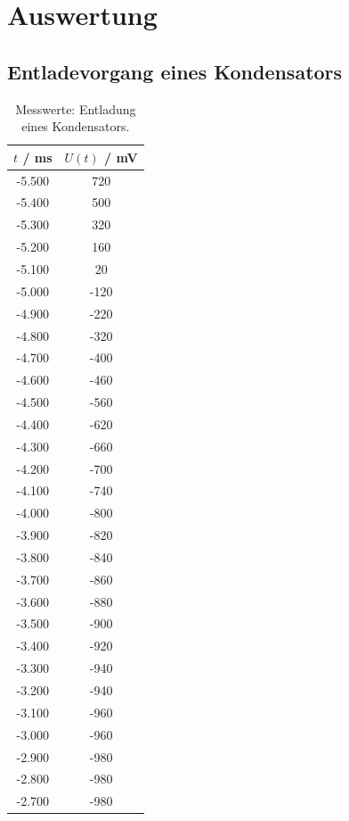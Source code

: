 \section{Auswertung}
\subsection{Entladevorgang eines Kondensators}

\begin{table}
  \centering
  \caption{Messwerte: Entladung eines Kondensators.}
  \label{table1}
  \begin{tabular}{c c}
    \toprule
    $t$ / ms & $U(t)$ / mV \\
    \midrule
    -5.500 & 720\\
    -5.400 & 500\\
    -5.300 & 320\\
    -5.200 & 160\\
    -5.100 & 20\\
    -5.000 & -120\\
    -4.900 & -220\\
    -4.800 & -320\\
    -4.700 & -400\\
    -4.600 & -460\\
    -4.500 & -560\\
    -4.400 & -620\\
    -4.300 & -660\\
    -4.200 & -700\\
    -4.100 & -740\\
    -4.000 & -800\\
    -3.900 & -820\\
    -3.800 & -840\\
    -3.700 & -860\\
    -3.600 & -880\\
    -3.500 & -900\\
    -3.400 & -920\\
    -3.300 & -940\\
    -3.200 & -940\\
    -3.100 & -960\\
    -3.000 & -960\\
    -2.900 & -980\\
    -2.800 & -980\\
    -2.700 & -980\\
    \bottomrule
  \end{tabular}
\end{table}


